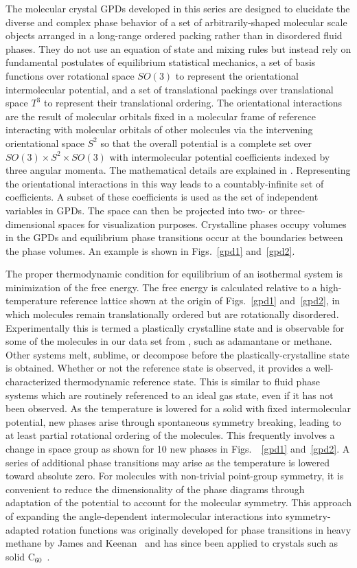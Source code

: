 \documentclass[preprint]{iucr}              %
\begin{document}
The molecular crystal GPDs developed in this series are designed to elucidate
the diverse and complex phase behavior of a set of arbitrarily-shaped molecular
scale objects arranged in a long-range ordered packing rather than in
disordered fluid phases.  They do not use an equation of state and mixing rules
but instead rely on fundamental postulates of equilibrium statistical
mechanics, a set of basis functions over rotational space $SO(3)$ to represent
the orientational intermolecular potential, and a set of translational packings
over translational space $T^3$ to represent their translational ordering.  The
orientational interactions are the result of molecular orbitals fixed in a
molecular frame of reference interacting with molecular orbitals of other
molecules via the intervening orientational space $S^2$ so that the overall
potential is a complete set over $SO(3) \times S^2 \times SO(3)$ with
intermolecular potential coefficients indexed by three angular momenta.  The
mathematical details are explained in \cite{Mettes04}.  Representing the
orientational interactions in this way leads to a countably-infinite set of
coefficients.  A subset of these coefficients is used as the set of independent
variables in GPDs.  The space can then be projected into two- or
three-dimensional spaces for visualization purposes.  Crystalline phases occupy
volumes in the GPDs and equilibrium phase transitions occur at the boundaries
between the phase volumes.  An example is shown in Figs.~\ref{gpd1}
and~\ref{gpd2}.

The proper thermodynamic condition for equilibrium of an isothermal system is
minimization of the free energy.  The free energy is calculated relative to a
high-temperature
reference lattice shown at the origin of Figs.~\ref{gpd1}
and~\ref{gpd2}, in which
molecules remain translationally ordered but are rotationally disordered. 
Experimentally this is
termed a plastically crystalline state \cite{Sherwood79} and is observable for
some of the molecules in our data set from \cite{McClurg09}, such as
adamantane or methane.  Other systems melt, sublime, or decompose before the
plastically-crystalline state is obtained.  Whether or not the reference state
is observed, it provides a well-characterized thermodynamic reference state. 
This is similar to fluid phase systems which are routinely referenced to an
ideal gas state, even if it has not been observed.  As the temperature is
lowered for a solid with fixed intermolecular potential, new phases arise
through spontaneous symmetry breaking, leading to at least partial rotational
ordering of the molecules.  This frequently involves a change in space group as
shown for 10 new phases in Figs.~~\ref{gpd1}
and~\ref{gpd2}.  A series of additional phase transitions may arise as the
temperature is lowered toward absolute zero. For molecules with non-trivial
point-group symmetry, it is convenient to reduce the dimensionality of the phase
diagrams through adaptation of the potential to account for the molecular
symmetry. This approach of expanding the angle-dependent intermolecular
interactions into symmetry-adapted rotation functions was originally developed
for phase transitions in heavy methane by James and Keenan~\cite{James59} and
has since been applied to crystals such as solid
C$_{60}$~\cite{Michel92,Lamoen99}.
\end{document}
